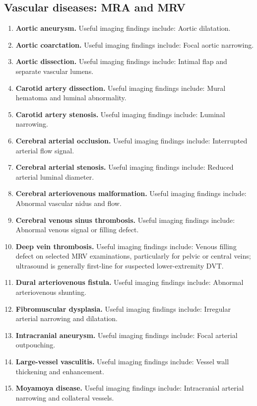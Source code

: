 \subsection{Vascular diseases: MRA and MRV}
\begin{enumerate}[leftmargin=*,itemsep=0.45em,topsep=0.4em]
\item \textbf{Aortic aneurysm.} Useful imaging findings include: Aortic dilatation.
\item \textbf{Aortic coarctation.} Useful imaging findings include: Focal aortic narrowing.
\item \textbf{Aortic dissection.} Useful imaging findings include: Intimal flap and separate vascular lumens.
\item \textbf{Carotid artery dissection.} Useful imaging findings include: Mural hematoma and luminal abnormality.
\item \textbf{Carotid artery stenosis.} Useful imaging findings include: Luminal narrowing.
\item \textbf{Cerebral arterial occlusion.} Useful imaging findings include: Interrupted arterial flow signal.
\item \textbf{Cerebral arterial stenosis.} Useful imaging findings include: Reduced arterial luminal diameter.
\item \textbf{Cerebral arteriovenous malformation.} Useful imaging findings include: Abnormal vascular nidus and flow.
\item \textbf{Cerebral venous sinus thrombosis.} Useful imaging findings include: Abnormal venous signal or filling defect.
\item \textbf{Deep vein thrombosis.} Useful imaging findings include: Venous filling defect on selected MRV examinations, particularly for pelvic or central veins; ultrasound is generally first-line for suspected lower-extremity DVT.
\item \textbf{Dural arteriovenous fistula.} Useful imaging findings include: Abnormal arteriovenous shunting.
\item \textbf{Fibromuscular dysplasia.} Useful imaging findings include: Irregular arterial narrowing and dilatation.
\item \textbf{Intracranial aneurysm.} Useful imaging findings include: Focal arterial outpouching.
\item \textbf{Large-vessel vasculitis.} Useful imaging findings include: Vessel wall thickening and enhancement.
\item \textbf{Moyamoya disease.} Useful imaging findings include: Intracranial arterial narrowing and collateral vessels.

\end{enumerate}
